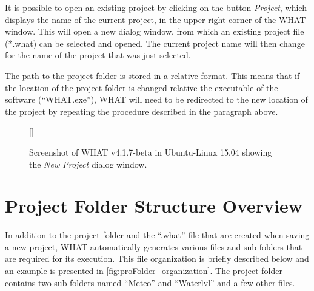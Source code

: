 \documentclass[WHATMANUAL.tex]{subfiles}
\begin{document}
It is possible to open an existing project by clicking on the button \emph{Project}, which displays the name of the current project, in the upper right corner of the WHAT window. This will open a new dialog window, from which an existing project file (*.what) can be selected and opened. The current project name will then change for the name of the project that was just selected.

The path to the project folder is stored in a relative format. This means that if the location of the project folder is changed relative the executable of the software (``WHAT.exe''),  WHAT will need to be redirected to the new location of the project by repeating the procedure described in the paragraph above.

\begin{figure}[!h]
    \setlength{\fboxsep}{0pt}
    [\FBwidth]
	{
	 \caption{Screenshot of WHAT v4.1.7-beta in Ubuntu-Linux 15.04 showing the \emph{New Project} dialog window.}
	 \label{fig:new_proj_win}
	}
	{
	}
\end{figure}

\section{Project Folder Structure Overview}\label{subsec:folder_structure}

In addition to the project folder and the ``.what'' file that are created when saving a new project, WHAT automatically generates various files and sub-folders that are required for its execution. This file organization is briefly described below and an example is presented in \cref{fig:proFolder_organization}. The project folder contains two sub-folders named ``Meteo'' and ``Waterlvl'' and a few other files.
\end{document}
